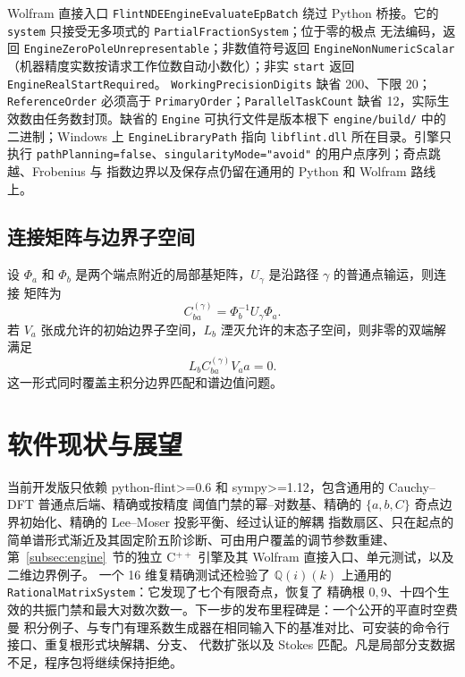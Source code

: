 \documentclass[11pt,a4paper]{ctexart}
\renewcommand{\_}{\origunderscore\allowbreak}
\begin{document}
Wolfram 直接入口
\texttt{FlintNDE}\allowbreak\texttt{Engine}\allowbreak\texttt{Evaluate}\allowbreak\texttt{EpBatch}
绕过 Python 桥接。它的 \texttt{system} 只接受无多项式的 \texttt{PartialFractionSystem}；位于零的极点
无法编码，返回 \texttt{EngineZeroPoleUnrepresentable}；非数值符号返回
\texttt{EngineNonNumericScalar}（机器精度实数按请求工作位数自动小数化）；非实 \texttt{start} 返回
\texttt{EngineRealStartRequired}。
\texttt{WorkingPrecisionDigits} 缺省 200、下限 20；\texttt{ReferenceOrder} 必须高于
\texttt{PrimaryOrder}；\texttt{ParallelTaskCount} 缺省 12，实际生效数由任务数封顶。缺省的
\texttt{Engine} 可执行文件是版本根下 \texttt{engine/build/} 中的二进制；Windows 上
\texttt{EngineLibraryPath} 指向 \texttt{libflint.dll} 所在目录。引擎只执行
\texttt{pathPlanning=false}、\texttt{singularityMode="avoid"} 的用户点序列；奇点跳越、Frobenius 与
指数边界以及保存点仍留在通用的 Python 和 Wolfram 路线上。

\subsection{连接矩阵与边界子空间}

设 $\Phi_a$ 和 $\Phi_b$ 是两个端点附近的局部基矩阵，$U_\gamma$ 是沿路径 $\gamma$ 的普通点输运，则连接
矩阵为
\begin{equation}
  C_{ba}^{(\gamma)}=\Phi_b^{-1}U_\gamma\Phi_a.
\end{equation}
若 $V_a$ 张成允许的初始边界子空间，$L_b$ 湮灭允许的末态子空间，则非零的双端解满足
\begin{equation}
  L_b C_{ba}^{(\gamma)}V_a a=0.
  \label{eq:two-end-condition}
\end{equation}
这一形式同时覆盖主积分边界匹配和谱边值问题。

\section{软件现状与展望}

当前开发版只依赖 python-flint>=0.6 和 sympy>=1.12，包含通用的 Cauchy--DFT 普通点后端、精确或按精度
阈值门禁的幂--对数基、精确的 $\{a,b,C\}$ 奇点边界初始化、精确的 Lee--Moser 投影平衡、经过认证的解耦
指数扇区、只在起点的简单谱形式渐近及其固定阶五阶诊断、可由用户覆盖的调节参数重建、
第~\ref{subsec:engine}~节的独立 C$^{++}$ 引擎及其 Wolfram 直接入口、单元测试，以及二维边界例子。
一个 16 维复精确测试还检验了 $\mathbb Q(i)(k)$ 上通用的
\texttt{Rational}\allowbreak\texttt{Matrix}\allowbreak\texttt{System}：它发现了七个有限奇点，恢复了
精确根 $0,9$、十四个生效的共振门禁和最大对数次数一。下一步的发布里程碑是：一个公开的平直时空费曼
积分例子、与专门有理系数生成器在相同输入下的基准对比、可安装的命令行接口、重复根形式块解耦、分支、
代数扩张以及 Stokes 匹配。凡是局部分支数据不足，程序包将继续保持拒绝。

\enlargethispage{1.5\baselineskip}


\end{document}
